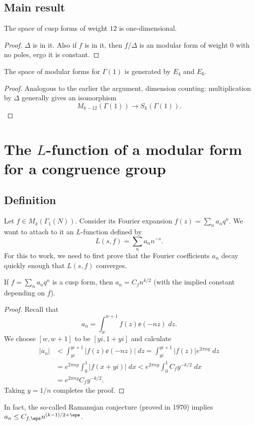 \subsection{Main result}
\begin{proposition}
  The space of cusp forms of weight $12$ is one-dimensional.
\end{proposition}
\begin{proof}
  $\Delta$ is in it.
  Also if $f$ is in it,
  then $f/\Delta$ is an modular form of weight $0$ with no poles,
  ergo it is constant.
\end{proof}

\begin{theorem}
  The space of modular forms for $\Gamma(1)$
  is generated by $E_4$ and $E_6$.
\end{theorem}
\begin{proof}
  Analogous to the earlier the argument, dimension counting:
  multiplication by $\Delta$ generally gives an isomorphism
  \[ M_{k-12}(\Gamma(1)) \to S_{k}(\Gamma(1)). \]
\end{proof}


\section{The $L$-function of a modular form for a congruence group}
\subsection{Definition}
Let $f \in M_k(\Gamma_1(N))$.
Consider its Fourier expansion $f(z) = \sum_n a_n q^{n}$.
We want to attach to it an $L$-function defined by
\[ L(s,f) = \sum_n a_n n^{-s}. \]
For this to work, we need to first prove that
the Fourier coefficients $a_n$ decay quickly enough that
$L(s,f)$ converges.

\begin{lemma}
  If $f = \sum_n a_n q^{n}$ is a cusp form, then $a_n = C_f n^{k/2}$
  (with the implied constant depending on $f$).
\end{lemma}
\begin{proof}
  Recall that
  \[ a_n = \int_w^{w+1} f(z) \ee(-nz) \; dz. \]
  We choose $[w,w+1]$ to be $[yi, 1+yi]$ and calculate
  \begin{align*}
    \left\lvert a_n \right\rvert
    &< \int_{yi}^{yi+1} \left\lvert f(z) \ee(-nz) \right\rvert \; dz
    = \int_{yi}^{yi+1} \left\lvert f(z) \right\rvert e^{2\pi n y} \; dz \\
    &= e^{2\pi n y} \int_0^1 \left\lvert f(x+yi) \right\rvert \; dx
    < e^{2\pi n y} \int_0^1 C_f y^{-k/2} \; dx \\
    &= e^{2\pi n y} C_f y^{-k/2}.
  \end{align*}
  Taking $y=1/n$ completes the proof.
\end{proof}
\begin{remark}
  In fact, the so-called Ramanujan conjecture (proved in 1970)
  implies $a_n \le C_{f,\eps} n^{(k-1)/2+\eps}$.
\end{remark}

